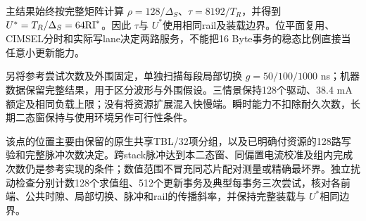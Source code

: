 

主结果始终按完整矩阵计算 $\rho=128/\Delta_S$、$\tau=8192/T_R$，并得到 $U^*=T_R/\Delta_S=64\mathrm{RI}^*$。因此 $\tau$与 $U^*$使用相同rail及装载边界。位平面复用、CIMSEL分时和实际写lane决定两路服务，不能把16 Byte事务的稳态比例直接当任意小更新能力。




另将参考尝试次数及外围固定，单独扫描每段局部切换 $g=50/100/1000$ ns；机器数据保留完整结果，用于区分波形与外围假设。三情景保持128个驱动、38.4 mA额定及相同负载上限；没有将资源扩展混入快慢端。瞬时能力不扣除耐久次数，长期二态窗保持与使用环境另作可行性条件。

该点的位置主要由保留的原生共享TBL/32项分组，以及已明确付资源的128路写验和完整脉冲次数决定。跨stack脉冲达到本二态窗、同偏置电流校准及组内完成次数仍是参考实现的条件；数值范围不冒充同芯片配对测量或精确最坏界。独立扰动检查分别计数128个求值组、512个更新事务及典型每事务三次尝试，核对各前端、公共时隙、局部切换、脉冲和rail的传播斜率，并保持完整装载与 $U^*$相同边界。
